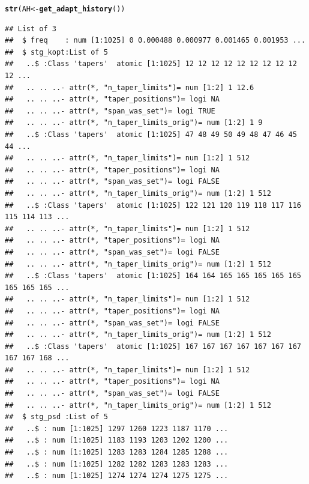 \documentclass[10pt]{article}\usepackage[]{graphicx}\usepackage[]{color}
\makeatletter
\newcommand{\hlstd}[1]{\textcolor[rgb]{0.345,0.345,0.345}{#1}}%
\newcommand{\hlkwb}[1]{\textcolor[rgb]{0.69,0.353,0.396}{#1}}%
\newcommand{\hlkwd}[1]{\textcolor[rgb]{0.737,0.353,0.396}{\textbf{#1}}}%
\newenvironment{kframe}{%
 \def\at@end@of@kframe{}%
 \ifinner\ifhmode%
  \def\at@end@of@kframe{\end{minipage}}%
  \begin{minipage}{\columnwidth}%
 \fi\fi%
 \def\FrameCommand##1{\hskip\@totalleftmargin \hskip-\fboxsep
 \colorbox{shadecolor}{##1}\hskip-\fboxsep
     \hskip-\linewidth \hskip-\@totalleftmargin \hskip\columnwidth}%
 \MakeFramed {\advance\hsize-\width
   \@totalleftmargin\z@ \linewidth\hsize
   \@setminipage}}%
 {\par\unskip\endMakeFramed%
 \at@end@of@kframe}
\newenvironment{knitrout}{}{} %
\makeatother
\begin{document}
\begin{knitrout}
\begin{kframe}
{\ttfamily\noindent\itshape\color{messagecolor}{\#\# Stage\ \ 0 est. (pilot) \\\#\# 	environment\ \ ** .psdEnv **\ \ refreshed\\\#\# detrending (and demeaning)\\\#\# Stage\ \ 1 est. (Ave. S.V.R. -15.8 dB) \\\#\# Stage\ \ 2 est. (Ave. S.V.R. -35.0 dB) \\\#\# Stage\ \ 3 est. (Ave. S.V.R. -44.1 dB) \\\#\# Stage\ \ 4 est. (Ave. S.V.R. -44.8 dB) \\\#\# Normalized\ \ single-sided PSD\ \ (PSD)\ \ to single-sided PSD for sampling-freq.\ \ 1}}\begin{alltt}
\hlkwd{str}\hlstd{(AH} \hlkwb{<-} \hlkwd{get_adapt_history}\hlstd{())}
\end{alltt}
\begin{verbatim}
## List of 3
##  $ freq    : num [1:1025] 0 0.000488 0.000977 0.001465 0.001953 ...
##  $ stg_kopt:List of 5
##   ..$ :Class 'tapers'  atomic [1:1025] 12 12 12 12 12 12 12 12 12 12 ...
##   .. .. ..- attr(*, "n_taper_limits")= num [1:2] 1 12.6
##   .. .. ..- attr(*, "taper_positions")= logi NA
##   .. .. ..- attr(*, "span_was_set")= logi TRUE
##   .. .. ..- attr(*, "n_taper_limits_orig")= num [1:2] 1 9
##   ..$ :Class 'tapers'  atomic [1:1025] 47 48 49 50 49 48 47 46 45 44 ...
##   .. .. ..- attr(*, "n_taper_limits")= num [1:2] 1 512
##   .. .. ..- attr(*, "taper_positions")= logi NA
##   .. .. ..- attr(*, "span_was_set")= logi FALSE
##   .. .. ..- attr(*, "n_taper_limits_orig")= num [1:2] 1 512
##   ..$ :Class 'tapers'  atomic [1:1025] 122 121 120 119 118 117 116 115 114 113 ...
##   .. .. ..- attr(*, "n_taper_limits")= num [1:2] 1 512
##   .. .. ..- attr(*, "taper_positions")= logi NA
##   .. .. ..- attr(*, "span_was_set")= logi FALSE
##   .. .. ..- attr(*, "n_taper_limits_orig")= num [1:2] 1 512
##   ..$ :Class 'tapers'  atomic [1:1025] 164 164 165 165 165 165 165 165 165 165 ...
##   .. .. ..- attr(*, "n_taper_limits")= num [1:2] 1 512
##   .. .. ..- attr(*, "taper_positions")= logi NA
##   .. .. ..- attr(*, "span_was_set")= logi FALSE
##   .. .. ..- attr(*, "n_taper_limits_orig")= num [1:2] 1 512
##   ..$ :Class 'tapers'  atomic [1:1025] 167 167 167 167 167 167 167 167 167 168 ...
##   .. .. ..- attr(*, "n_taper_limits")= num [1:2] 1 512
##   .. .. ..- attr(*, "taper_positions")= logi NA
##   .. .. ..- attr(*, "span_was_set")= logi FALSE
##   .. .. ..- attr(*, "n_taper_limits_orig")= num [1:2] 1 512
##  $ stg_psd :List of 5
##   ..$ : num [1:1025] 1297 1260 1223 1187 1170 ...
##   ..$ : num [1:1025] 1183 1193 1203 1202 1200 ...
##   ..$ : num [1:1025] 1283 1283 1284 1285 1288 ...
##   ..$ : num [1:1025] 1282 1282 1283 1283 1283 ...
##   ..$ : num [1:1025] 1274 1274 1274 1275 1275 ...
\end{verbatim}
\end{kframe}
\end{knitrout}
\end{document}
